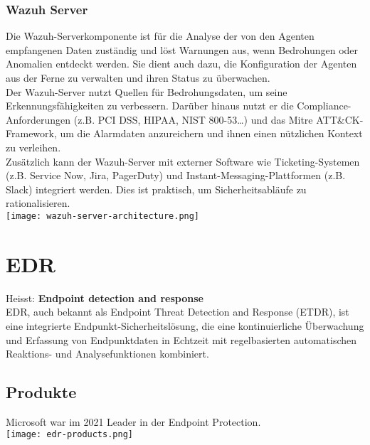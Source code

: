\subsubsection{Wazuh Server}
Die Wazuh-Serverkomponente ist für die Analyse der von den Agenten empfangenen Daten zuständig und löst Warnungen aus, wenn Bedrohungen oder Anomalien entdeckt werden.
Sie dient auch dazu, die Konfiguration der Agenten aus der Ferne zu verwalten und ihren Status zu überwachen.\\

Der Wazuh-Server nutzt Quellen für Bedrohungsdaten, um seine Erkennungsfähigkeiten zu verbessern.
Darüber hinaus nutzt er die Compliance-Anforderungen (z.B. PCI DSS, HIPAA, NIST 800-53\dots) und das Mitre ATT\&CK-Framework, um die Alarmdaten anzureichern und ihnen einen nützlichen Kontext zu verleihen.\\

Zusätzlich kann der Wazuh-Server mit externer Software wie Ticketing-Systemen (z.B. Service Now, Jira, PagerDuty) und Instant-Messaging-Plattformen (z.B. Slack) integriert werden. 
Dies ist praktisch, um Sicherheitsabläufe zu rationalisieren.\\

\texttt{[image: wazuh-server-architecture.png]}

\section{EDR}
Heisst: \textbf{Endpoint detection and response}\\

EDR, auch bekannt als Endpoint Threat Detection and Response (ETDR), ist eine integrierte Endpunkt-Sicherheitslösung, die eine kontinuierliche Überwachung und Erfassung von Endpunktdaten in Echtzeit mit regelbasierten automatischen Reaktions- und Analysefunktionen kombiniert.

\subsection{Produkte}
Microsoft war im 2021 Leader in der Endpoint Protection.\\
\texttt{[image: edr-products.png]}